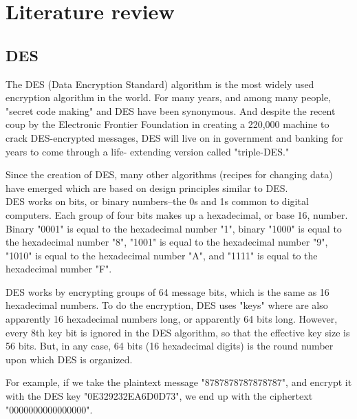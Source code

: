 \documentclass[fleqn, journal, onecolumn]{IEEEtran}             %
\theoremstyle{break}                                            %
\begin{document}
\tableofcontents{}
\label{sec:Index}

\clearpage



\section{Literature review}

  \subsection{DES}

    The DES (Data Encryption Standard) algorithm is the most widely used encryption algorithm in the world. 
    For many years, and among many people, "secret code making" and DES have been synonymous. 
    And despite the recent coup by the Electronic Frontier Foundation in creating a 220,000 machine to 
    crack DES-encrypted messages, DES will live on in government and banking for years to come through a 
    life- extending version called "triple-DES."

    Since the creation of DES, many other algorithms (recipes for changing data) have emerged which are 
    based on design principles similar to DES.  \\[0.2cm]


    DES works on bits, or binary numbers--the 0s and 1s common to digital computers. 
    Each group of four bits makes up a hexadecimal, or base 16, number. Binary "0001" is 
    equal to the hexadecimal number "1", binary "1000" is equal to the hexadecimal number "8", 
    "1001" is equal to the hexadecimal number "9", "1010" is equal to the hexadecimal number "A", 
    and "1111" is equal to the hexadecimal number "F".

    DES works by encrypting groups of 64 message bits, which is the same as 16 hexadecimal numbers. 
    To do the encryption, DES uses "keys" where are also apparently 16 hexadecimal numbers long, or 
    apparently 64 bits long. However, every 8th key bit is ignored in the DES algorithm, so that the 
    effective key size is 56 bits. But, in any case, 64 bits (16 hexadecimal digits) is the round number 
    upon which DES is organized.

    For example, if we take the plaintext message "8787878787878787", and encrypt it with the DES key 
    "0E329232EA6D0D73", we end up with the ciphertext "0000000000000000". 
    
\end{document}

